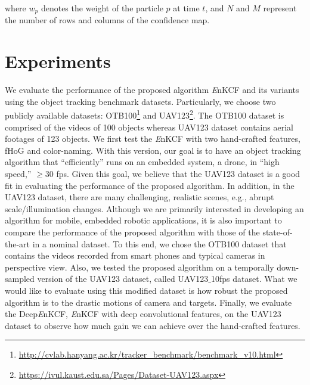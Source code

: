 \documentclass[10pt,twocolumn,letterpaper]{article}
\begin{document}
where $w_{p}$ denotes the weight of the particle $p$ at time $t$, and 
$N$ and $M$ represent the number of rows and columns of the confidence map. 

\section{Experiments} \label{sc:Experiments}
We evaluate the performance of the proposed algorithm {\it E}nKCF and its variants 
using the object tracking benchmark datasets. Particularly, we choose two publicly available datasets:
OTB100\footnote{\url{http://cvlab.hanyang.ac.kr/tracker_benchmark/benchmark_v10.html}}
and UAV123\footnote{\url{https://ivul.kaust.edu.sa/Pages/Dataset-UAV123.aspx}}\cite{mueller2016uav123}.
The OTB100 dataset is comprised of the videos of 100 objects
whereas UAV123 dataset contains aerial footages of 123 objects.  We
first test the {\it E}nKCF with two hand-crafted
features, fHoG and color-naming.  With this version, our goal is to
have an object tracking algorithm that ``efficiently'' runs on an
embedded system, a drone, in ``high speed,'' $\ge 30$
fps. Given this goal, we believe that the UAV123 dataset is a good fit in
evaluating the performance of the proposed algorithm. In addition, in
the UAV123 dataset, there are many challenging, realistic scenes,
e.g., abrupt scale/illumination changes. Although we are primarily
interested in developing an algorithm for mobile, embedded robotic
applications, it is also important to compare the performance of the
proposed algorithm with those of the state-of-the-art in a nominal
dataset. To this end, we chose the OTB100 dataset that contains the
videos recorded from smart phones and typical cameras in perspective
view. Also, we tested the proposed algorithm on a temporally
down-sampled version of the UAV123 dataset, called UAV123$\_$10fps
dataset. What we would like to evaluate using this modified dataset is
how robust the proposed algorithm is to the drastic motions of camera
and targets. Finally, we evaluate the Deep{\it E}nKCF, {\it E}nKCF
with deep convolutional features, on the UAV123 dataset to observe how much gain we
can achieve over the hand-crafted features.
\end{document}
